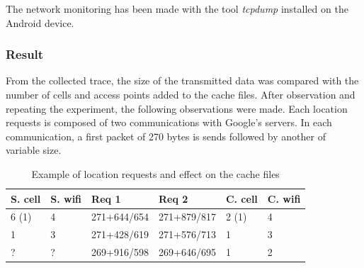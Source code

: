 The network monitoring has been made with the tool \emph{tcpdump} installed on the Android device.

\subsubsection{Result}

From the collected trace, the size of the transmitted data was compared with the number of cells and access points added to the cache files.
After observation and repeating the experiment, the following observations were made.
Each location requests is composed of two communications with Google's servers.
In each communication, a first packet of 270 bytes is sends followed by another of variable size.\\


\begin{table}[h]
  \centering
  \begin{tabular}[h]{ |l|l|l|l|l|l|}
    \hline
    S. cell & S. wifi & Req 1 & Req 2 & C. cell & C. wifi \\
    \hline
    6 (1)    &     4 & 271+644/654 & 271+879/817 & 2 (1) & 4 \\
    \hline
    1       &   3  & 271+428/619 & 271+576/713 & 1 & 3 \\
    \hline
    ? & ? & 269+916/598 & 269+646/695 & 1 & 2 \\
    \hline
  \end{tabular}
  \caption{Example of location requests and effect on the cache files}
  \label{tab:expe-req-pattern}
\end{table}

